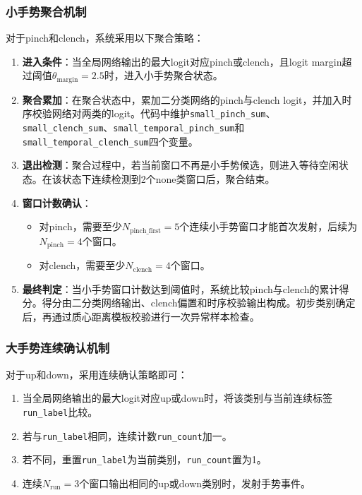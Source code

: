 \documentclass[lettersize,journal]{IEEEtran}
\begin{document}
\subsubsection{小手势聚合机制}

对于pinch和clench，系统采用以下聚合策略：

\begin{enumerate}[leftmargin=*]
    \item \textbf{进入条件}：当全局网络输出的最大logit对应pinch或clench，且logit margin超过阈值$\theta_\mathrm{margin} = 2.5$时，进入小手势聚合状态。
    \item \textbf{聚合累加}：在聚合状态中，累加二分类网络的pinch与clench logit，并加入时序校验网络对两类的logit。代码中维护\texttt{small\_pinch\_sum}、\texttt{small\_clench\_sum}、\texttt{small\_temporal\_pinch\_sum}和\texttt{small\_temporal\_clench\_sum}四个变量。
    \item \textbf{退出检测}：聚合过程中，若当前窗口不再是小手势候选，则进入等待空闲状态。在该状态下连续检测到2个none类窗口后，聚合结束。
    \item \textbf{窗口计数确认}：
    \begin{itemize}
        \item 对pinch，需要至少$N_\mathrm{pinch\_first} = 5$个连续小手势窗口才能首次发射，后续为$N_\mathrm{pinch} = 4$个窗口。
        \item 对clench，需要至少$N_\mathrm{clench} = 4$个窗口。
    \end{itemize}
    \item \textbf{最终判定}：当小手势窗口计数达到阈值时，系统比较pinch与clench的累计得分。得分由二分类网络输出、clench偏置和时序校验输出构成。初步类别确定后，再通过质心距离模板校验进行一次异常样本检查。
\end{enumerate}

\subsubsection{大手势连续确认机制}

对于up和down，采用连续确认策略即可：

\begin{enumerate}[leftmargin=*]
    \item 当全局网络输出的最大logit对应up或down时，将该类别与当前连续标签\texttt{run\_label}比较。
    \item 若与\texttt{run\_label}相同，连续计数\texttt{run\_count}加一。
    \item 若不同，重置\texttt{run\_label}为当前类别，\texttt{run\_count}置为1。
    \item 连续$N_\mathrm{run} = 3$个窗口输出相同的up或down类别时，发射手势事件。
\end{enumerate}
\end{document}
